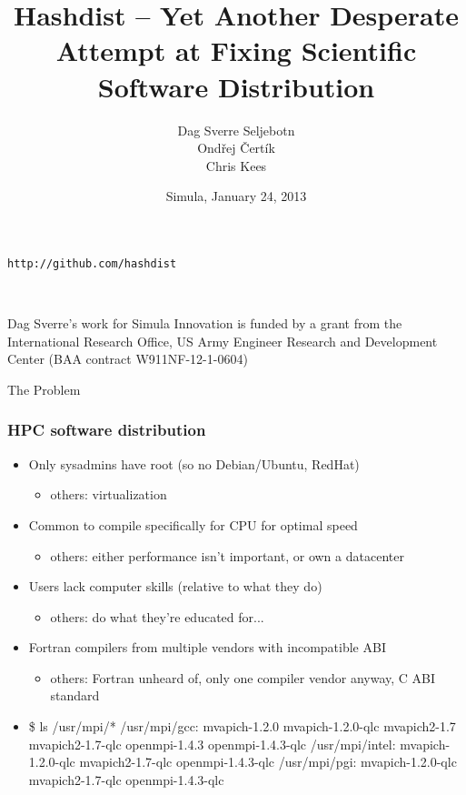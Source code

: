 \documentclass[sans,mathserif]{beamer}
\title{Hashdist -- Yet Another Desperate Attempt at Fixing Scientific Software Distribution}
\author{Dag Sverre Seljebotn\\Ond\v{r}ej \v{C}ert\'{i}k\\Chris Kees}
\date{Simula, January 24, 2013}
\begin{document}
\begin{frame}
  \titlepage

  \begin{center} {\tt http://github.com/hashdist}
  \end{center}
~

{\footnotesize

Dag Sverre's work for Simula Innovation is funded by a grant from the \\
International Research Office, US Army Engineer Research and Development Center
(BAA contract W911NF-12-1-0604)
}

\end{frame}

\begin{frame}
  \begin{center}
    {\LARGE The Problem}
  \end{center}
\end{frame}


\begin{frame}[fragile]
  \frametitle{HPC software distribution}
  \begin{itemize}
  \item<+-> Only sysadmins have root (so no Debian/Ubuntu, RedHat)
    \begin{itemize}
    \item others: virtualization
    \end{itemize}
  \item<+-> Common to compile specifically for CPU for optimal speed
    \begin{itemize}
    \item others: either performance isn't important, or own a datacenter
    \end{itemize}
  \item<+-> Users lack computer skills (relative to what they do)
    \begin{itemize}
    \item others: do what they're educated for...
    \end{itemize}
  \item<+-> Fortran compilers from multiple vendors with incompatible ABI
    \begin{itemize}
    \item others: Fortran unheard of, only one compiler vendor anyway, C ABI standard
    \end{itemize}
\item<+->
{\small
  \begin{semiverbatim}
\$ ls /usr/mpi/*
/usr/mpi/gcc:
mvapich-1.2.0  mvapich-1.2.0-qlc  mvapich2-1.7
mvapich2-1.7-qlc  openmpi-1.4.3  openmpi-1.4.3-qlc
/usr/mpi/intel:
mvapich-1.2.0-qlc  mvapich2-1.7-qlc  openmpi-1.4.3-qlc
/usr/mpi/pgi:
mvapich-1.2.0-qlc  mvapich2-1.7-qlc  openmpi-1.4.3-qlc
  \end{semiverbatim}
}
\end{itemize}
\end{frame}
\end{document}
